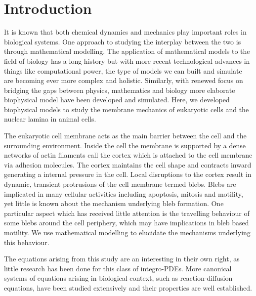 \chapter{Introduction}

It is known that both chemical dynamics and mechanics play important roles in biological systems. One approach to studying the interplay between the two is through mathematical modelling. The application of mathematical models to the field of biology has a long history but with more recent technological advances in things like computational power, the type of models we can built and simulate are becoming ever more complex and holistic.  Similarly, with renewed focus on bridging the gaps between physics, mathematics and biology more elaborate biophysical model have been developed and simulated. Here, we developed biophysical models to study the membrane mechanics of eukaryotic cells and the nuclear lamina in animal cells. 

The eukaryotic cell membrane acts as the main barrier between the cell and the surrounding environment. Inside the cell the membrane is supported by a dense networks of actin filaments call the cortex which is attached to the cell membrane via adhesion molecules. The cortex maintains the cell shape and contracts inward generating a internal pressure in the cell. Local disruptions to the cortex result in dynamic, transient protrusions of the cell membrane termed blebs. Blebs are implicated in many cellular activities including apoptosis, mitosis and motility, yet little is known about the mechanism underlying bleb formation. One particular aspect which has received little attention is the travelling behaviour of some blebs around the cell periphery, which may have implications in bleb based motility. We use mathematical modelling to elucidate the mechanisms underlying this behaviour. 

The equations arising from this study are an interesting in their own right, as little research has been done for this class of integro-PDEs. More canonical systems of equations arising in biological context, such as reaction-diffusion equations, have been studied extensively and their properties are well established.



